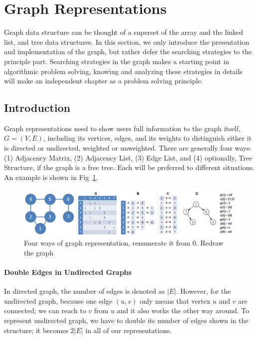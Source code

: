 \documentclass[../main.tex]{subfiles}
\begin{document}
\section{Graph Representations}
\label{graph_representation}
Graph data structure can be thought of a superset of the array and the linked list, and tree data structures. In this section, we only introduce the presentation and implementation of the graph, but rather defer the searching strategies to the principle part. Searching strategies in the graph makes a starting point in algorithmic problem solving, knowing and analyzing these strategies in details will make an independent chapter as a problem solving principle. 
\subsection{Introduction}
Graph representations need to show users full information to the graph itself, $G = (V, E)$, including  its vertices, edges, and its weights to distinguish either it is directed or undirected, weighted or unweighted.  There are generally four ways: (1) Adjacency Matrix, (2) Adjacency List, (3) Edge List, and (4) optionally, Tree Structure, if the graph is a free tree. Each will be preferred to different situations. An example is shown in Fig~\ref{fig:graph_represent}.
\begin{figure}[!ht]
    \centering
    \includegraphics[width=\columnwidth]{fig/graph_representation.png}
    \caption{Four ways of graph representation, renumerate it from 0. Redraw the graph}
    \label{fig:graph_represent}
\end{figure}

\paragraph{Double Edges in Undirected Graphs} In directed graph, the number of edges is denoted as $|E|$. However, for the undirected graph, because one edge $(u, v)$ only means that vertex $u$ and $v$ are connected; we can reach to  $v$ from $u$ and it also works the other way around. To represent undirected graph, we have to double its number of edges shown in the structure; it becomes $2|E|$ in all of our representations. %
\end{document}
